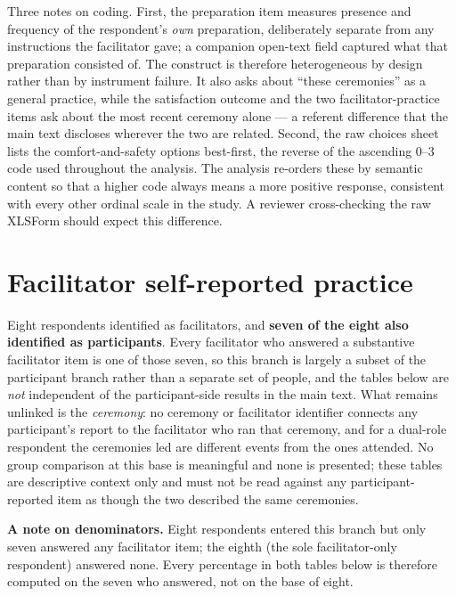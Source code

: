 \documentclass[12pt]{article}
\begin{document}
\noindent
Three notes on coding. First, the preparation item measures presence and frequency of the respondent's
\emph{own} preparation, deliberately separate from any instructions the facilitator gave; a companion
open-text field captured what that preparation consisted of. The construct is therefore heterogeneous by
design rather than by instrument failure. It also asks about ``these ceremonies'' as a general practice,
while the satisfaction outcome and the two facilitator-practice items ask about the most recent ceremony
alone --- a referent difference that the main text discloses wherever the two are related. Second, the raw
choices sheet lists the comfort-and-safety
options best-first, the reverse of the ascending 0--3 code used throughout the analysis. The analysis
re-orders these by semantic content so that a higher code always means a more positive response, consistent
with every other ordinal scale in the study. A reviewer cross-checking the raw XLSForm should expect this
difference.

\section{Facilitator self-reported practice}

Eight respondents identified as facilitators, and \textbf{seven of the eight also identified as
participants}. Every facilitator who answered a substantive facilitator item is one of those seven, so this
branch is largely a subset of the participant branch rather than a separate set of people, and the tables
below are \emph{not} independent of the participant-side results in the main text. What remains unlinked is
the \emph{ceremony}: no ceremony or facilitator identifier connects any participant's report to the
facilitator who ran that ceremony, and for a dual-role respondent the ceremonies led are different events
from the ones attended. No group comparison at this base is meaningful and none is presented; these tables
are descriptive context only and must not be read against any participant-reported item as though the two
described the same ceremonies.

\noindent
\textbf{A note on denominators.} Eight respondents entered this branch but only seven answered any
facilitator item; the eighth (the sole facilitator-only respondent) answered none. Every percentage in both
tables below is therefore computed on the seven who answered, not on the base of eight.
\end{document}
